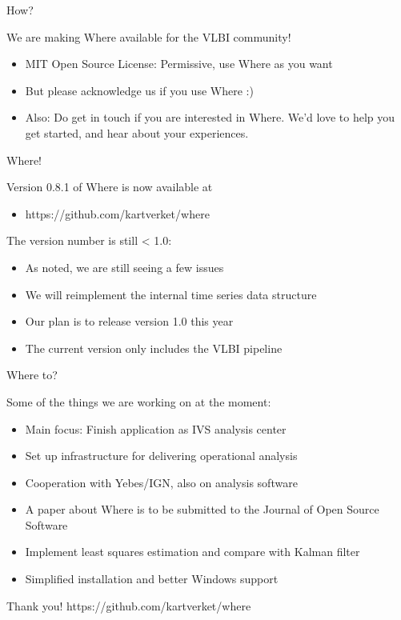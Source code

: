 \documentclass[ignorenonframetext,12pt,t]{beamer}
\begin{document}
\begin{frame}{How?}
  \begin{centering}
    We are making Where available for the VLBI community!
  \end{centering}
  \pause
  
  \begin{itemize}
  \item<2-> MIT Open Source License: Permissive, use Where as you want
  \item<3-> But please acknowledge us if you use Where :)
  \item<4-> Also: Do get in touch if you are interested in Where. We'd love to help you get started, and hear about your experiences.
  \end{itemize}
\end{frame}


\begin{frame}{Where!}

  Version 0.8.1 of Where is now available at
  \begin{itemize}
  \item https://github.com/kartverket/where
  \end{itemize}
  \pause

  The version number is still < 1.0:
  \begin{itemize}
  \item As noted, we are still seeing a few issues
  \item We will reimplement the internal time series data structure
  \item Our plan is to release version 1.0 this year
  \item The current version only includes the VLBI pipeline
  \end{itemize}

\end{frame}


\begin{frame}{Where to?}

  \begin{centering}
    Some of the things we are working on at the moment:
  \end{centering}
  \pause
  
  \begin{itemize}
  \item<2-> Main focus: Finish application as IVS analysis center
  \item<3-> Set up infrastructure for delivering operational analysis
  \item<4-> Cooperation with Yebes/IGN, also on analysis software
  \item<5-> A paper about Where is to be submitted to the Journal of Open Source Software
  \item<6-> Implement least squares estimation and compare with Kalman filter
  \item<7-> Simplified installation and better Windows support
  \end{itemize}
\end{frame}


\begin{frame}[c]{Thank you!}
  \LARGE https://github.com/kartverket/where
\end{frame}
  
\end{document}
